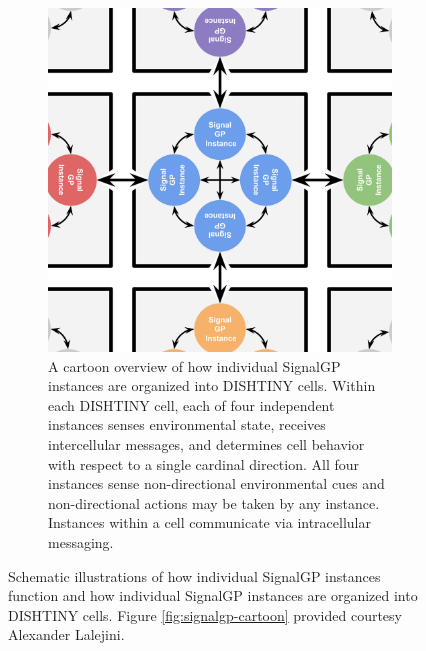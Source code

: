 \begin{figure}[!htbp]
\begin{subfigure}{\linewidth}
\centering
\includegraphics[width=\linewidth]{img/dishtinygp-cartoon}
\caption{
A cartoon overview of how individual SignalGP instances are organized into DISHTINY cells.
Within each DISHTINY cell, each of four independent instances senses environmental state, receives intercellular messages, and determines cell behavior with respect to a single cardinal direction.
All four instances sense non-directional environmental cues and non-directional actions may be taken by any instance.
Instances within a cell communicate via intracellular messaging.
}
\label{fig:dishtinygp-cartoon}
\end{subfigure}

\caption{
Schematic illustrations of how individual SignalGP instances function and how individual SignalGP instances are organized into DISHTINY cells.
Figure \ref{fig:signalgp-cartoon} provided courtesy Alexander Lalejini.
}
\label{fig:signalgp-dishtinygp}
\end{figure}

